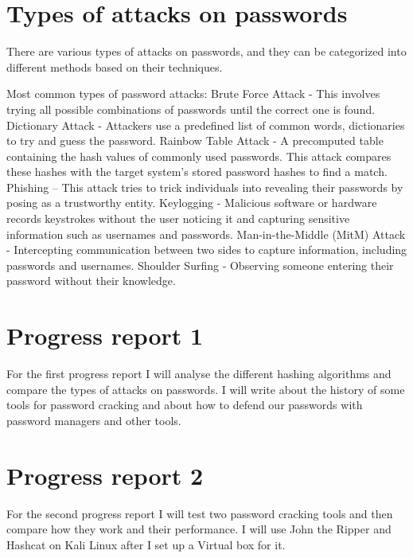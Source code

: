 \documentclass[10pt,oneside,english,a4paper]{article}
\begin{document}
\section{Types of attacks on passwords}
There are various types of attacks on passwords, and they can be categorized into different methods based on their techniques. 

Most common types of password attacks:
Brute Force Attack - This involves trying all possible combinations of passwords until the correct one is found.
Dictionary Attack - Attackers use a predefined list of common words, dictionaries to try and guess the password.
Rainbow Table Attack - A precomputed table containing the hash values of commonly used passwords. This attack compares these hashes with the target system's stored password hashes to find a match.
Phishing – This attack tries to trick individuals into revealing their passwords by posing as a trustworthy entity.
Keylogging - Malicious software or hardware records keystrokes without the user noticing it and capturing sensitive information such as usernames and passwords.
Man-in-the-Middle (MitM) Attack - Intercepting communication between two sides to capture information, including passwords and usernames.
Shoulder Surfing - Observing someone entering their password without their knowledge.




\section{Progress report 1}
For the first progress report I will analyse the different hashing algorithms and compare the types of attacks on passwords. I will write about the history of some tools for password cracking and about how to defend our passwords with password managers and other tools. 

\section{Progress report 2}
For the second progress report I will test two password cracking tools and then compare how they work and their performance. I will use John the Ripper and Hashcat on Kali Linux after I set up a Virtual box for it.







\nocite{*}
\end{document}
